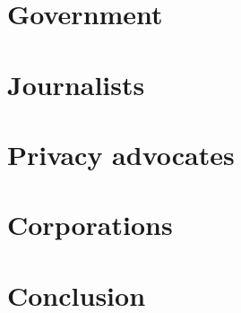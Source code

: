 

\section{Government}


\section{Journalists}


\section{Privacy advocates}


\section{Corporations}


\section{Conclusion}
